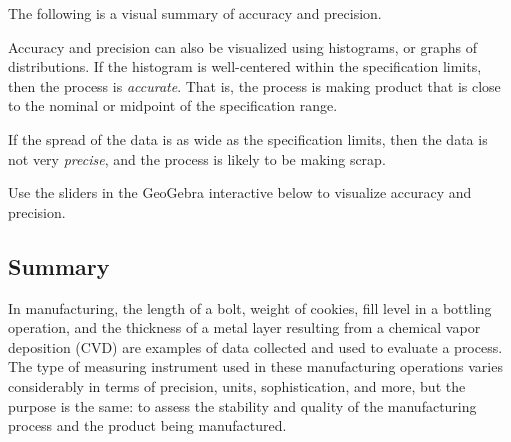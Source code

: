 \documentclass{ximera}
\begin{document}
The following is a visual summary of accuracy and precision.

\begin{center}
      \end{center}

Accuracy and precision can also be visualized using histograms, or graphs of distributions.  If the histogram is well-centered within the specification limits, then the process is \emph{accurate}. That is, the process is making product that is close to the nominal or midpoint of the specification range.

If the spread of the data is as wide as the specification limits, then the data is not very \emph{precise}, and the process is likely to be making scrap.

Use the sliders in the GeoGebra interactive below to visualize accuracy and precision.
\begin{onlineOnly}
\begin{center} 
\end{center}
\end{onlineOnly}

\subsection*{Summary}

In manufacturing, the length of a bolt, weight of cookies, fill level in a bottling operation, and the thickness of a metal layer resulting from a chemical vapor deposition (CVD) are examples of data collected and used to evaluate a process.  The type of measuring instrument used in these manufacturing operations varies considerably in terms of precision, units, sophistication, and more, but the purpose is the same: to assess the stability and quality of the manufacturing process and the product being manufactured. 
\end{document}
